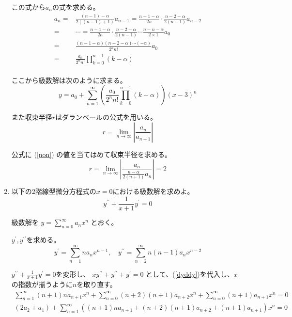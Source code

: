 \documentclass[12pt,b5paper]{ltjsarticle}
\begin{document}
\begin{enumerate}
      この式から$a_n$の式を求める。
      \begin{align}
       a_{n}=&\frac{(n-1)-\alpha}{2((n-1)+1)}a_{n-1}
       =\frac{n-1-\alpha}{2n}\cdot\frac{n-2-\alpha}{2(n-1)}a_{n-2}\\
       =& \cdots
       =\frac{n-1-\alpha}{2n}\cdot\frac{n-2-\alpha}{2(n-1)}\cdots\frac{n-n-\alpha}{2\times 1}a_{0}\\
       =& \frac{(n-1-\alpha)(n-2-\alpha)\cdots(-\alpha)}{2^nn!}a_0\\
       =& \frac{a_0}{2^nn!}\prod_{k=0}^{n-1}(k-\alpha)\\
      \end{align}

      ここから級数解は次のように求まる。
      \begin{equation}
       y = a_0 + \sum_{n=1}^{\infty}
        \left(\frac{a_0}{2^nn!}\prod_{k=0}^{n-1}(k-\alpha)\right)
        (x-3)^n
      \end{equation}

      また収束半径$r$はダランベールの公式を用いる。
      \begin{equation}
       r = \lim_{n\rightarrow \infty} \left\lvert \frac{a_n}{a_{n+1}} \right\rvert
      \end{equation}

      公式に (\ref{non}) の値を当てはめて収束半径を求める。
      \begin{equation}
       r = \lim_{n\rightarrow \infty} \left\lvert \frac{a_n}{\frac{n-\alpha}{2(n+1)}a_{n}} \right\rvert
        = 2
      \end{equation}

      \hrulefill
 \item
      以下の2階線型微分方程式の$x=0$における級数解を求めよ。
      \begin{equation}
       y^{\prime\prime} + \frac{1}{x+1}y^{\prime} =0
      \end{equation}

      \dotfill

      級数解を
      $y=\sum_{n=0}^{\infty}a_nx^n$
      とおく。

      $y^{\prime},y^{\prime\prime}$を求める。
      \begin{equation}
       y^{\prime} = \sum_{n=1}^{\infty}na_nx^{n-1}
        ,\quad
       y^{\prime\prime} = \sum_{n=2}^{\infty}n(n-1)a_nx^{n-2}
       \label{dyddy}
      \end{equation}

      $y^{\prime\prime} + \frac{1}{x+1}y^{\prime} =0$を変形し、
      $xy^{\prime\prime} + y^{\prime\prime} + y^{\prime} =0$
      として、(\ref{dyddy})を代入し、$x$の指数が揃うように$n$を取り直す。
      \begin{gather}
       \sum_{n=1}^{\infty}(n+1)na_{n+1}x^{n} + \sum_{n=0}^{\infty}(n+2)(n+1)a_{n+2}x^{n} + \sum_{n=0}^{\infty}(n+1)a_{n+1}x^{n} =0\\
       (2a_2+a_1)+ \sum_{n=1}^{\infty}( (n+1)na_{n+1} + (n+2)(n+1)a_{n+2} + (n+1)a_{n+1} )x^{n} =0
      \end{gather}


\end{enumerate}
\end{document}
